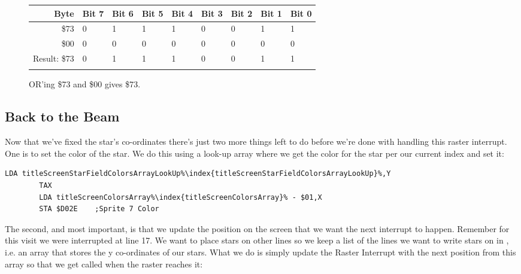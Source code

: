 \begin{figure}[H]
  {
    \setlength{\tabcolsep}{3.0pt}
    \setlength\cmidrulewidth{\heavyrulewidth} %
    \begin{adjustbox}{width=10cm,center}

      \begin{tabular}{rllllllll}
        \toprule
        Byte & Bit 7 & Bit 6 & Bit 5 & Bit 4 & Bit 3 & Bit 2 & Bit 1 & Bit 0        \\
        \midrule
        \$73 & 0 & 1 & 1 & 1 & 0 & 0 & 1 & 1 \\
        \$00 & 0 & 0 & 0 & 0 & 0 & 0 & 0 & 0 \\
        \midrule
        Result: \$73 & 0 & 1 & 1 & 1 & 0 & 0 & 1 & 1 \\
        \addlinespace
        \bottomrule
      \end{tabular}
    \end{adjustbox}
  }\caption*{OR'ing \$73 and \$00 gives \$73.}
\end{figure}

\subsection{Back to the Beam}
Now that we've fixed the star's co-ordinates there's just two more things left to do before we're done with
handling this raster interrupt. One is to set the color of the star. We do this using a look-up array
where we get the color for the star per our current index and set it:

\begin{lstlisting}[escapechar=\%]
        LDA titleScreenStarFieldColorsArrayLookUp%\index{titleScreenStarFieldColorsArrayLookUp}%,Y
        TAX
        LDA titleScreenColorsArray%\index{titleScreenColorsArray}% - $01,X
        STA $D02E    ;Sprite 7 Color
\end{lstlisting}

The second, and most important, is that we update the position on the screen that we want the next interrupt to
happen. Remember for this visit we were interrupted at line 17. We want to place stars on other lines so we keep
a list of the lines we want to write stars on in , i.e. an array that
stores the y co-ordinates of our stars. What we do is simply update the Raster Interrupt with the next position
from this array so that we get called when the raster reaches it:

